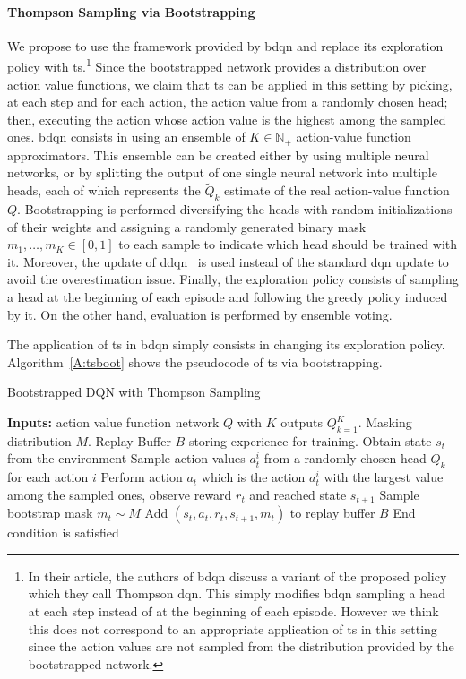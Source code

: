 \paragraph{Thompson Sampling via Bootstrapping} We propose to use the framework provided by \gls{bdqn} and replace its exploration policy with \gls{ts}.\footnote{In their article, the authors of \gls{bdqn} discuss a variant of the proposed policy which they call Thompson \gls{dqn}. This simply modifies \gls{bdqn} sampling a head at each step instead of at the beginning of each episode. However we think this does not correspond to an appropriate application of \gls{ts} in this setting since the action values are not sampled from the distribution provided by the bootstrapped network.} Since the bootstrapped network provides a distribution over action value functions, we claim that \gls{ts} can be applied in this setting by picking, at each step and for each action, the action value from a randomly chosen head; then, executing the action whose action value is the highest among the sampled ones.
\gls{bdqn} consists in using an ensemble of $K \in \mathbb{N_+}$ action-value function approximators. This ensemble can be created either by using multiple neural networks, or by splitting the output of one single neural network into multiple heads, each of which represents the $\tilde{Q}_k $ estimate of the real action-value function $Q$. Bootstrapping is performed diversifying the heads with random initializations of their weights and assigning a randomly generated binary mask $m_1, \dots, m_K \in [0,1]$ to each sample to indicate which head should be trained with it. Moreover, the update of \gls{ddqn}~\cite{van2016deep} is used instead of the standard \gls{dqn} update to avoid the overestimation issue. Finally, the exploration policy consists of sampling a head at the beginning of each episode and following the greedy policy induced by it. On the other hand, evaluation is performed by ensemble voting.

The application of \gls{ts} in \gls{bdqn} simply consists in changing its exploration policy. Algorithm~\ref{A:tsboot} shows the pseudocode of \gls{ts} via bootstrapping.
\begin{algorithm}
\caption{Bootstrapped DQN with Thompson Sampling}
\begin{algorithmic}[1]\label{A:tsboot}
  \STATE \textbf{Inputs:} action value function network $Q$ with $K$ outputs $Q_{k=1}^K$. Masking distribution $M$. Replay Buffer $B$ storing experience for training.
  \REPEAT
  \STATE Obtain state $s_t$ from the environment
  \STATE Sample action values $a_t^i$ from a randomly chosen head $Q_k$ for each action $i$
  \STATE Perform action $a_t$ which is the action $a_t^i$ with the largest value among the sampled ones, observe reward $r_t$ and reached state $s_{t+1}$
  \STATE Sample bootstrap mask $m_t \sim M$
  \STATE Add $(s_t, a_t, r_t, s_{t+1}, m_t)$ to replay buffer $B$
  \UNTIL End condition is satisfied
\end{algorithmic}
\end{algorithm}


